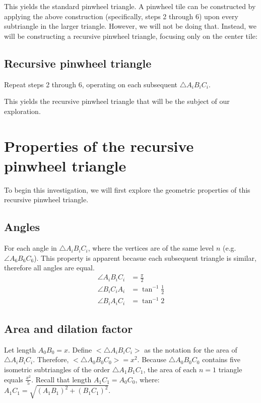 \noindent
This yields the standard pinwheel triangle. A pinwheel tile can be constructed by applying the above construction (specifically, steps 2 through 6) upon every subtriangle in the larger triangle. However, we will not be doing that. Instead, we will be constructing a recursive pinwheel triangle, focusing only on the center tile:



\newpage
\subsection{Recursive pinwheel triangle}
Repeat steps 2 through 6, operating on each subsequent $\triangle A_{i}B_{i}C_{i}$.


\noindent
This yields the recursive pinwheel triangle that will be the subject of our exploration.

\newpage



\section{Properties of the recursive pinwheel triangle}
To begin this investigation, we will first explore the geometric properties of this recursive pinwheel triangle.

\subsection{Angles}
For each angle in $\triangle A_{i}B_{i}C_{i}$, where the vertices are of the same level $n$ (e.g. $\angle A_{6}B_{6}C_{6}$). This property is apparent becasue each subsequent triangle is similar, therefore all angles are equal.
\begin{equation}
    \begin{aligned}
        \angle A_{i}B_{i}C_{i} &= \frac{\pi}{2} \\
        \angle B_{i}C_{i}A_{i} &= \tan^{-1}\frac{1}{2} \\
        \angle B_{i}A_{i}C_{i} &= \tan^{-1}2
    \end{aligned}
\end{equation}

\subsection{Area and dilation factor}
Let length $A_{0}B_{0} = x$. Define $\big<\triangle A_{i}B_{i}C_{i}\big>$ as the notation for the area of $\triangle A_{i}B_{i}C_{i}$. Therefore, $\big<\triangle A_{0}B_{0}C_{0}\big> = x^2$. Because $\triangle A_{0}B_{0}C_{0}$ contains five isometric subtriangles of the order $\triangle A_{1}B_{1}C_{1}$, the area of each $n = 1$ triangle equals $\frac{x^2}{5}$. Recall that length $A_{1}C_{1} = A_{0}C_{0}$, where: $A_{1}C_{1} = \sqrt{(A_{1}B_{1})^2 + (B_{1}C_{1})^2}$.

